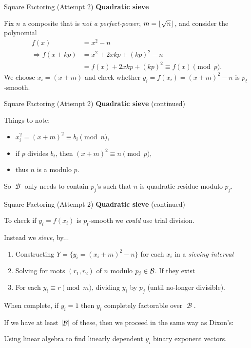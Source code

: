 \documentclass[11pt,aspectratio=1610,xcolor=dvipsnames]{beamer}
\DeclareMathOperator{\calB}{\mathcal{B}}
\DeclarePairedDelimiter{\abs}{\lvert}{\rvert}
\DeclarePairedDelimiter{\floor}{\lfloor}{\rfloor}
\newcommand{\emphcolor}{Red}
\newcommand{\Emph}[1]{{\color{\emphcolor}\emph{#1}}}
\begin{document}
\begin{frame}{Square Factoring}
    (Attempt 2) \textbf{Quadratic sieve}

    Fix $n$ a composite that is \Emph{not a perfect-power},
    $m=\floor{\sqrt{n}}$, and consider the polynomial
    \begin{align*}
        f(x) &= x^2 - n \\
        \Rightarrow
        f(x+kp)
        &= x^2 + 2xkp + (kp)^2 - n \\
        &= f(x) + 2xkp + (kp)^2
        \equiv f(x)\pmod p.
    \end{align*} \pause
    We choose $x_i = (x+m)$ and check whether
    $y_i = f(x_i) = (x+m)^2 - n$ is $p_t$-smooth.
\end{frame}

\begin{frame}{Square Factoring}
    (Attempt 2) \textbf{Quadratic sieve} (continued)

    Things to note:
    \begin{itemize}
        \item $x_i^2 = (x+m)^2 \equiv b_i\pmod n$,
        \item if $p$ divides $b_i$, then $(x+m)^2\equiv n\pmod p$,
        \item thus $n$ is a modulo $p$.
    \end{itemize} \pause
    So $\calB$ only needs to contain $p_j$'s such that $n$ is quadratic residue
    modulo $p_j$.
\end{frame}

\begin{frame}{Square Factoring}
    (Attempt 2) \textbf{Quadratic sieve} (continued)

    To check if $y_i = f(x_i)$ is $p_t$-smooth
    we \emph{could} use trial division.

    Instead we \Emph{sieve}\pause, by...
    \begin{enumerate}
        \item Constructing $Y = \{y_i=(x_i+m)^2-n\}$ for each $x_i$
            in a \Emph{sieving interval}
        \item Solving for roots $(r_1,r_2)$ of $n$ modulo $p_j\in\cal B$.
            If they exist
        \item For each $y_i\equiv r\pmod m$,
            dividing $y_i$ by $p_j$ (until no-longer divisible).
    \end{enumerate} \pause
    When complete, if $y_i=1$ then $y_i$ completely factorable over $\calB$.

    If we have at least $\abs{\calB}$ of these,
    then we proceed in the same way as Dixon's:

    Using linear algebra to find linearly dependent
    $y_i$ binary exponent vectors.
\end{frame}
\end{document}
